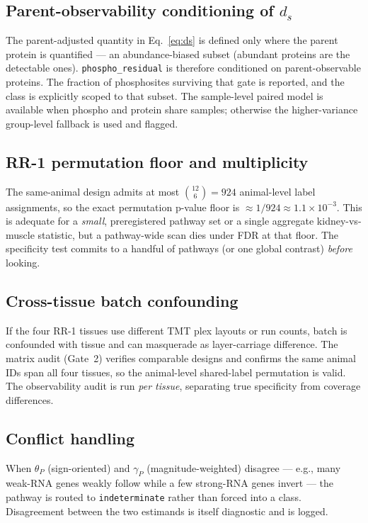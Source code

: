 \documentclass[11pt]{article}
\newcommand{\Cpho}{\texttt{phospho\_residual}}
\newcommand{\Cind}{\texttt{indeterminate}}
\begin{document}
\subsection{Parent-observability conditioning of $d_s$}
The parent-adjusted quantity in Eq.~\eqref{eq:ds} is defined only where the parent protein is quantified ---
an abundance-biased subset (abundant proteins are the detectable ones). \Cpho{} is therefore conditioned on
parent-observable proteins. The fraction of phosphosites surviving that gate is reported, and the class is
explicitly scoped to that subset. The sample-level paired model is available when phospho and protein share
samples; otherwise the higher-variance group-level fallback is used and flagged.

\subsection{RR-1 permutation floor and multiplicity}
The same-animal design admits at most $\binom{12}{6}=924$ animal-level label assignments, so the exact
permutation p-value floor is ${\approx}1/924\approx1.1\times10^{-3}$. This is adequate for a \emph{small},
preregistered pathway set or a single aggregate kidney-vs-muscle statistic, but a pathway-wide scan dies
under FDR at that floor. The specificity test commits to a handful of pathways (or one global contrast)
\emph{before} looking.

\subsection{Cross-tissue batch confounding}
If the four RR-1 tissues use different TMT plex layouts or run counts, batch is confounded with tissue and
can masquerade as layer-carriage difference. The matrix audit (Gate~2) verifies comparable designs and
confirms the same animal IDs span all four tissues, so the animal-level shared-label permutation is valid.
The observability audit is run \emph{per tissue}, separating true specificity from coverage differences.

\subsection{Conflict handling}
When $\theta_P$ (sign-oriented) and $\gamma_P$ (magnitude-weighted) disagree --- e.g., many weak-RNA genes
weakly follow while a few strong-RNA genes invert --- the pathway is routed to \Cind{} rather than forced
into a class. Disagreement between the two estimands is itself diagnostic and is logged.
\end{document}
